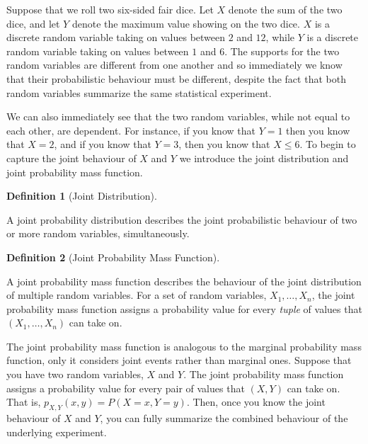 \documentclass[
  letterpaper,
  DIV=11,
  numbers=noendperiod]{scrreprt}
\theoremstyle{definition}
\theoremstyle{definition}
\theoremstyle{definition}
\newtheorem{definition}{Definition}[chapter]
\theoremstyle{remark}
\begin{document}
Suppose that we roll two six-sided fair dice. Let \(X\) denote the sum
of the two dice, and let \(Y\) denote the maximum value showing on the
two dice. \(X\) is a discrete random variable taking on values between
\(2\) and \(12\), while \(Y\) is a discrete random variable taking on
values between \(1\) and \(6\). The supports for the two random
variables are different from one another and so immediately we know that
their probabilistic behaviour must be different, despite the fact that
both random variables summarize the same statistical experiment.

We can also immediately see that the two random variables, while not
equal to each other, are dependent. For instance, if you know that
\(Y=1\) then you know that \(X = 2\), and if you know that \(Y = 3\),
then you know that \(X \leq 6\). To begin to capture the joint behaviour
of \(X\) and \(Y\) we introduce the joint distribution and joint
probability mass function.

\begin{definition}[Joint
Distribution]\protect\hypertarget{def-joint-distribution}{}\label{def-joint-distribution}

A joint probability distribution describes the joint probabilistic
behaviour of two or more random variables, simultaneously.

\end{definition}

\begin{definition}[Joint Probability Mass
Function]\protect\hypertarget{def-joint-pmf}{}\label{def-joint-pmf}

A joint probability mass function describes the behaviour of the joint
distribution of multiple random variables. For a set of random
variables, \(X_1, \dots, X_n\), the joint probability mass function
assigns a probability value for every \emph{tuple} of values that
\((X_1,\dots,X_n)\) can take on.

\end{definition}

The joint probability mass function is analogous to the marginal
probability mass function, only it considers joint events rather than
marginal ones. Suppose that you have two random variables, \(X\) and
\(Y\). The joint probability mass function assigns a probability value
for every pair of values that \((X,Y)\) can take on. That is,
\(p_{X,Y}(x,y) = P(X = x, Y = y)\). Then, once you know the joint
behaviour of \(X\) and \(Y\), you can fully summarize the combined
behaviour of the underlying experiment.
\end{document}
